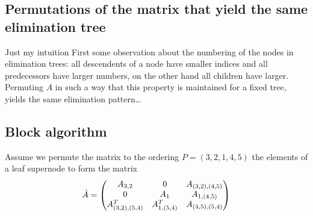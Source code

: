 \documentclass{article}
\begin{document}
\subsection{Permutations of the matrix that yield the same elimination tree}
Just my intuition
First some observation about the numbering of the nodes in elimination trees:
all descendents of a node have smaller indices and all predecessors have larger numbers, 
on the other hand all children have larger. 
Permuting $A$ in such a way that this property is maintained for a fixed tree, yields the 
same elimination pattern\dots


\subsection{Block algorithm}
Assume we permute the matrix to the ordering $P = (3,2,1,4,5)$
the elements of a leaf supernode to form the matrix 
\[\hat A = \begin{pmatrix}A_{3,2}          & 0            & A_{(3,2),(4,5)} \\
                 0                & A_{1}        & A_{1,(4,5)}\\
                 A_{(3,2),(5,4)}^T& A_{1,(5,4)}^T& A_{(4,5),(5,4)} \end{pmatrix}
                 \]
\end{document}
